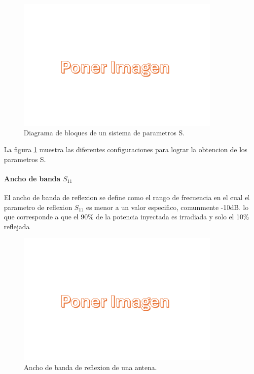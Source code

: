 \begin{figure}
    \centering
    \includegraphics[width = 10cm]{img/imagen.png}
    \caption{Diagrama de bloques de un sistema de parametros S.}
    \label{fig:sparam}
\end{figure}

La figura \ref{fig:sparam} muestra las diferentes configuraciones para lograr la obtencion de los parametros S.\\

\paragraph{Ancho de banda $S_{11}$} El ancho de banda de reflexion se define como el rango de frecuencia en el cual el parametro de reflexion $S_{11}$ es menor a un valor especifico, comunmente -10dB. lo que corresponde a que el 90\% de la potencia inyectada es irradiada y solo el 10\% reflejada\\

\begin{figure}
    \centering
    \includegraphics[width = 10cm]{img/imagen.png}
    \caption{Ancho de banda de reflexion de una antena.}
    \label{fig:bandwidth}
\end{figure}

